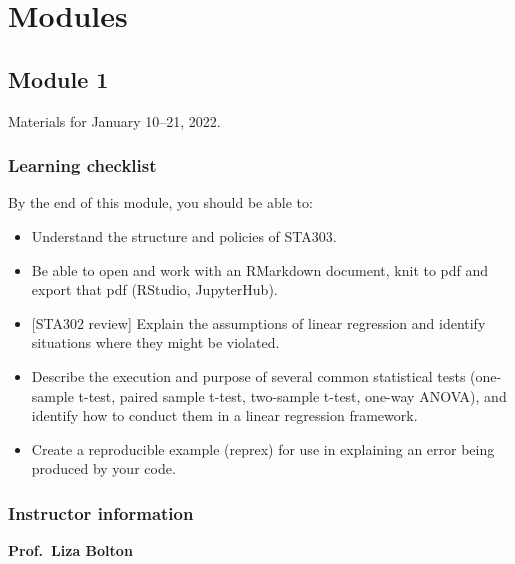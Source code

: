 \documentclass[
  openany]{book}
\providecommand{\tightlist}{%
  \setlength{\itemsep}{0pt}\setlength{\parskip}{0pt}}
\newenvironment{yellowbox}{
  \definecolor{shadecolor}{rgb}{254,187,67}  %
  \color{black}
  \begin{shaded}}
 {\end{shaded}}
\begin{document}
\hypertarget{part-modules}{%
\part*{Modules}\label{part-modules}}

\hypertarget{m1}{%
\chapter{Module 1}\label{m1}}

\begin{yellowbox}
Materials for January 10--21, 2022.

\end{yellowbox}

\hypertarget{learning-checklist}{%
\section{Learning checklist}\label{learning-checklist}}

By the end of this module, you should be able to:

\begin{itemize}
\tightlist
\item
  Understand the structure and policies of STA303.\\
\item
  Be able to open and work with an RMarkdown document, knit to pdf and export that pdf (RStudio, JupyterHub).
\item
  {[}STA302 review{]} Explain the assumptions of linear regression and identify situations where they might be violated.\\
\item
  Describe the execution and purpose of several common statistical tests (one-sample t-test, paired sample t-test, two-sample t-test, one-way ANOVA), and identify how to conduct them in a linear regression framework.\\
\item
  Create a reproducible example (reprex) for use in explaining an error being produced by your code.
\end{itemize}

\hypertarget{instructor-information}{%
\section{Instructor information}\label{instructor-information}}

\textbf{Prof.~Liza Bolton}
\end{document}
